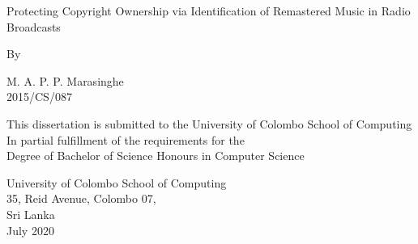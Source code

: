 \begin{titlepage}
    \begin{center}





        
        

Protecting Copyright Ownership via Identification of Remastered Music in Radio Broadcasts

\vspace{12pt}

By

\vspace{12pt}

M. A. P. P. Marasinghe \\
2015/CS/087

\vspace{140pt}


This dissertation is submitted to the University of Colombo School of Computing \\
In partial fulfillment of the requirements for the \\
Degree of Bachelor of Science Honours in Computer Science


\vspace{140pt}


University of Colombo School of Computing \\
35, Reid Avenue, Colombo 07, \\
Sri Lanka \\
July 2020


    \end{center}
\end{titlepage}